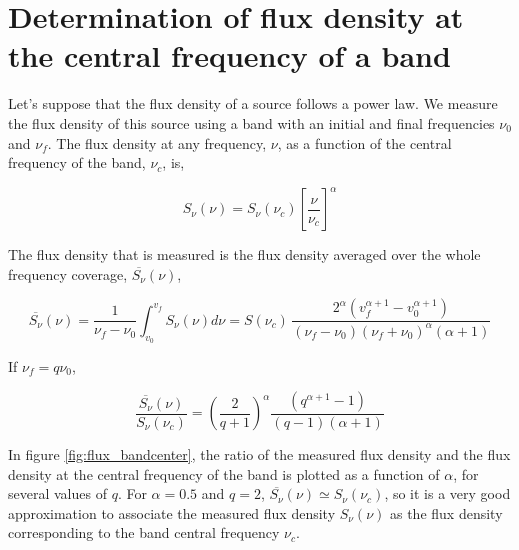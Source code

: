 \documentclass[12pt]{mythesis}
\begin{document}
\chapter{Determination of flux density at the central frequency of a band}

Let's suppose that the flux density of a source follows a power law. We measure the flux density of this source using a band with an initial and final frequencies $\nu_0$ and $\nu_f$. The flux density at any frequency, $\nu$, as a function of the central frequency of the band, $\nu_c$, is,

\begin{equation}
	S_\nu\left(\nu\right) = S_\nu(\nu_c)\left[\frac{\nu}{\nu_c}\right]^\alpha
\end{equation}

The flux density that is measured is the flux density averaged over the whole frequency coverage, $\overline{S_\nu}(\nu)$,

\begin{equation}
	\overline{S_\nu}\left(\nu\right) = \frac{1}{\nu_f-\nu_0} \int^{v_f}_{v_0} S_\nu(\nu)d\nu =S(\nu_c)\, \frac{2^\alpha (v_f^{\alpha+1}-v_0^{\alpha+1})}{(\nu_f-\nu_0)(\nu_f+\nu_0)^{\alpha}(\alpha+1)}
\end{equation}

If $\nu_f=q\nu_0$,

\begin{equation}
	\frac{\overline{S_\nu}(\nu)}{S_\nu(\nu_c)} = \left(\frac{2}{q+1}\right)^\alpha \frac{(q^{\alpha+1}-1)}{(q-1)(\alpha+1)}
\end{equation}

In figure \ref{fig:flux_bandcenter}, the ratio of the measured flux density and the flux density at the central frequency of the band is plotted as a function of $\alpha$, for several values of $q$. For $\alpha=0.5$ and $q=2$, $\overline{S_\nu}(\nu)\simeq S_\nu(\nu_c)$, so it is a very good approximation to associate the measured flux density $S_\nu(\nu)$ as the flux density corresponding to the band central frequency $\nu_c$.
\end{document}
